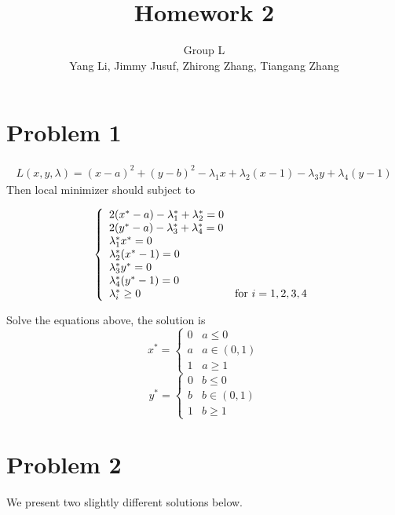 \documentclass{article}
\title{Homework 2}
\author{Group L\\
Yang Li, Jimmy Jusuf, Zhirong Zhang, Tiangang Zhang}
\begin{document}
\maketitle


\section{Problem 1}
\begin{eqnarray*}
L(x,y,\lambda)=(x-a)^2+(y-b)^2-\lambda_1 x+\lambda_2 (x-1)-\lambda_3 y +\lambda_4 (y-1)
\end{eqnarray*}
Then local minimizer should subject to

\begin{equation}  
\left\{  
             \begin{array}{ll}
             2(x^*-a)-\lambda_1^*+\lambda_2^*=0\\  
             2(y^*-a)-\lambda_3^*+\lambda_4^*=0\\
             \lambda_1^* x^*=0\\
             \lambda_2^*(x^*-1)=0\\
             \lambda_3^* y^*=0\\
             \lambda_4^*(y^*-1)=0\\
             \lambda_i^* \geq 0 & \textnormal{for~} i=1,2,3,4
             \end{array}  
\right.  
\end{equation}  

Solve the equations above, the solution is
\begin{equation}  
x^*=
\left\{  
             \begin{array}{ll}
             0 & a\leq 0\\
             a & a \in (0,1) \\
             1 & a \geq 1
             \end{array}  
\right.  
\end{equation} 
\begin{equation}  
y^*=
\left\{  
             \begin{array}{ll}
             0 & b\leq 0\\
             b & b \in (0,1) \\
             1 & b \geq 1
             \end{array}  
\right.  
\end{equation}  

\section{Problem 2}
We present two slightly different solutions below.
\end{document}
